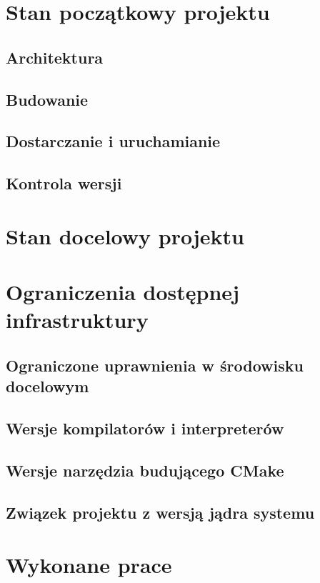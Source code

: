 \chapter{Stan początkowy projektu}
\label{cha:pocz}

\section{Architektura}
\section{Budowanie}
\section{Dostarczanie i uruchamianie}
\section{Kontrola wersji}


\chapter{Stan docelowy projektu}
\label{cha:docel}


\chapter{Ograniczenia dostępnej infrastruktury}
\label{cha:ogra}

\section{Ograniczone uprawnienia w środowisku docelowym}
\section{Wersje kompilatorów i interpreterów}
\section{Wersje narzędzia budującego CMake}
\section{Związek projektu z wersją jądra systemu}

\chapter{Wykonane prace}
\label{cha:prace}

